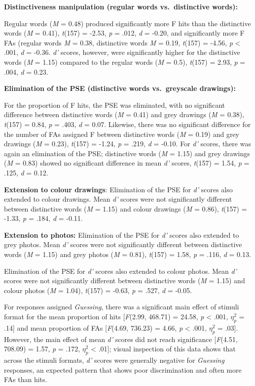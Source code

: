 \documentclass[
  11pt,
]{article}
\begin{document}
\textbf{Distinctiveness manipulation (regular words vs.~distinctive
words):}

Regular words (\emph{M} = 0.48) produced significantly more F hits than
the distinctive words (\emph{M} = 0.41), \emph{t}(157) = -2.53, \emph{p}
= .012, \emph{d} = -0.20, and significantly more F FAs (regular words
\emph{M} = 0.38, distinctive words \emph{M} = 0.19, \emph{t}(157) =
-4.56, \emph{p} \textless{} .001, \emph{d} = -0.36. \emph{d'} scores,
however, were significantly higher for the distinctive words (\emph{M} =
1.15) compared to the regular words (\emph{M} = 0.5), \emph{t}(157) =
2.93, \emph{p} = .004, \emph{d} = 0.23.

\textbf{Elimination of the PSE (distinctive words vs.~greyscale
drawings):}

For the proportion of F hits, the PSE was eliminated, with no
significant difference between distinctive words (\emph{M} = 0.41) and
grey drawings (\emph{M} = 0.38), \emph{t}(157) = 0.84, \emph{p} = .403,
\emph{d} = 0.07. Likewise, there was no significant difference for the
number of FAs assigned F between distinctive words (\emph{M} = 0.19) and
grey drawings (\emph{M} = 0.23), \emph{t}(157) = -1.24, \emph{p} = .219,
\emph{d} = -0.10. For \emph{d'} scores, there was again an elimination
of the PSE; distinctive words (\emph{M} = 1.15) and grey drawings
(\emph{M} = 0.83) showed no significant difference in mean \emph{d'}
scores, \emph{t}(157) = 1.54, \emph{p} = .125, \emph{d} = 0.12.

\textbf{Extension to colour drawings}: Elimination of the PSE for
\emph{d'} scores also extended to colour drawings. Mean \emph{d'} scores
were not significantly different between distinctive words (\emph{M} =
1.15) and colour drawings (\emph{M} = 0.86), \emph{t}(157) = -1.33,
\emph{p} = .184, \emph{d} = -0.11.

\textbf{Extension to photos:} Elimination of the PSE for \emph{d'}
scores also extended to grey photos. Mean \emph{d'} scores were not
significantly different between distinctive words (\emph{M} = 1.15) and
grey photos (\emph{M} = 0.81), \emph{t}(157) = 1.58, \emph{p} = .116,
\emph{d} = 0.13.

Elimination of the PSE for \emph{d'} scores also extended to colour
photos. Mean \emph{d'} scores were not significantly different between
distinctive words (\emph{M} = 1.15) and colour photos (\emph{M} = 1.04),
\emph{t}(157) = -0.63, \emph{p} = .527, \emph{d} = -0.05.

\newpage

For responses assigned \emph{Guessing}, there was a significant main
effect of stimuli format for the mean proportion of hits
{[}\emph{F}(2.99, 468.71) = 24.58, \emph{p} \textless{} .001,
\(\eta^2_p\) = .14{]} and mean proportion of FAs {[}\emph{F}(4.69,
736.23) = 4.66, \emph{p} \textless{} .001, \(\eta^2_p\) = .03{]}.
However, the main effect of mean \emph{d'} scores did not reach
significance {[}\emph{F}(4.51, 708.09) = 1.57, \emph{p} = .172,
\(\eta^2_p\) \textless{} .01{]}; visual inspection of this data shows
that across the stimuli formats, \emph{d'} scores were generally
negative for \emph{Guessing} responses, an expected pattern that shows
poor discrimination and often more FAs than hits.
\end{document}

